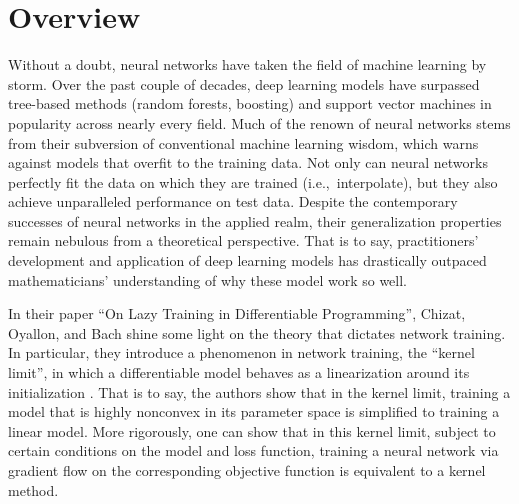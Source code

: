 \documentclass{article}
\begin{document}
\vspace*{\fill}

\pagebreak


\vspace*{\fill}

\begin{centering}
\tableofcontents
\end{centering}

\vspace*{\fill}

\pagebreak

\section{Overview}
Without a doubt, neural networks have taken the field of machine learning by storm. Over the past couple of decades, deep learning models have surpassed tree-based methods (random forests, boosting) and support vector machines in popularity across nearly every field. Much of the renown of neural networks stems from their subversion of conventional machine learning wisdom, which warns against models that overfit to the training data. Not only can neural networks perfectly fit the data on which they are trained (i.e.,~interpolate), but they also achieve unparalleled performance on test data. Despite the contemporary successes of neural networks in the applied realm, their generalization properties remain nebulous from a theoretical perspective. That is to say, practitioners' development and application of deep learning models has drastically outpaced mathematicians' understanding of why these model work so well.

In their paper \enquote{On Lazy Training in Differentiable Programming}, Chizat, Oyallon, and Bach shine some light on the theory that dictates network training. In particular, they introduce a phenomenon in network training, the \enquote{kernel limit}, in which a differentiable model behaves as a linearization around its initialization \cite{chizat2018lazy}. That is to say, the authors show that in the kernel limit, training a model that is highly nonconvex in its parameter space is simplified to training a linear model. More rigorously, one can show that in this kernel limit, subject to certain conditions on the model and loss function, training a neural network via gradient flow on the corresponding objective function is equivalent to a kernel method.
\end{document}

